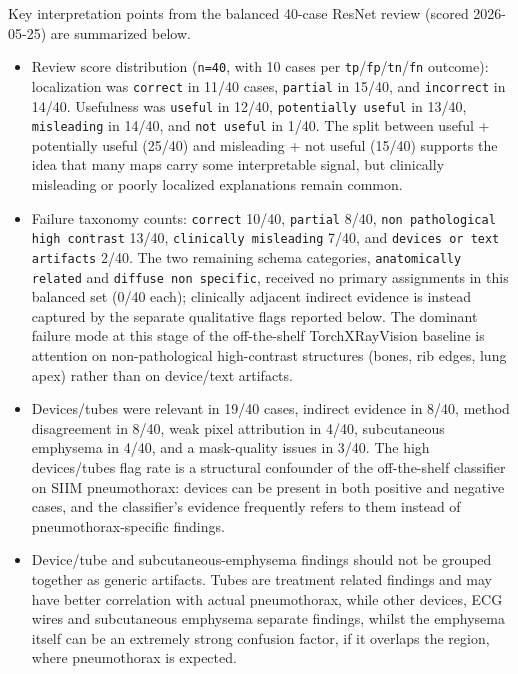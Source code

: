 Key interpretation points from the balanced 40-case ResNet review
(scored 2026-05-25) are summarized below. 
\begin{itemize}
\item Review score distribution
(\texttt{n=40}, with 10 cases per
\texttt{tp}/\texttt{fp}/\texttt{tn}/\texttt{fn} outcome): localization
was \texttt{correct} in 11/40 cases, \texttt{partial} in 15/40, and
\texttt{incorrect} in 14/40. Usefulness was \texttt{useful} in 12/40,
\texttt{potentially \allowbreak useful} in 13/40, \texttt{misleading} in 14/40, and
\texttt{not \allowbreak useful} in 1/40. The split between useful + potentially
useful (25/40) and misleading + not useful (15/40) supports the idea that
 many maps carry some interpretable signal, but
clinically misleading or poorly localized explanations remain common.
\item
Failure taxonomy counts: \texttt{correct} 10/40, \texttt{partial} 8/40,
\texttt{non \allowbreak pathological \allowbreak high \allowbreak contrast} 13/40,
\texttt{clinically \allowbreak misleading} 7/40, and
\texttt{devices \allowbreak or text \allowbreak artifacts} 2/40. The two remaining schema
categories, \texttt{anatomically \allowbreak related} and
\texttt{diffuse \allowbreak non \allowbreak specific}, received no primary assignments in this
balanced set (0/40 each); clinically adjacent indirect evidence is instead
captured by the separate qualitative flags reported below. The dominant
failure mode at
this stage of the off-the-shelf TorchXRayVision baseline is attention on
non-pathological high-contrast structures (bones, rib edges, lung apex)
rather than on device/text artifacts.
\item Devices/tubes were relevant in 19/40 cases,
indirect evidence in 8/40, method disagreement in 8/40, weak pixel
attribution in 4/40, subcutaneous emphysema in 4/40, and a mask-quality
issues in 3/40. The high devices/tubes flag rate is a structural
confounder of the off-the-shelf classifier on SIIM pneumothorax: devices
can be present in both positive and negative cases, and the classifier's 
evidence frequently refers to them instead of pneumothorax-specific
findings.
\item Device/tube and subcutaneous-emphysema
findings should not be grouped together as generic artifacts. 
Tubes are treatment related findings and may have better correlation with actual pneumothorax,
while other devices, ECG wires and subcutaneous emphysema separate findings, whilst the emphysema 
itself can be an extremely strong confusion factor, if it overlaps the region, where pneumothorax is expected. 

\end{itemize}
